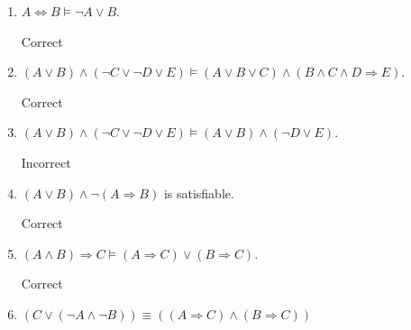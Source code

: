 \documentclass{article}
\begin{document}
\begin{enumerate}
\begin{enumerate}[label=($\alph*$)]
    \item $A \Leftrightarrow B \models \neg A \vee B$.

    \color{blue}
        Correct
    \color{black}



    \item $(A \vee B) \wedge (\neg C \vee \neg D \vee E) \models (A \vee B \vee C) \wedge (B \wedge C \wedge D \Rightarrow E)$.

    \color{blue}
        Correct
    \color{black}



    \item $(A \vee B) \wedge (\neg C \vee \neg D \vee E) \models (A \vee B) \wedge (\neg D \vee E)$.

    \color{blue}
        Incorrect
    \color{black}



    \item $(A \vee B) \wedge \neg (A \Rightarrow B)$ is satisfiable.

    \color{blue}
        Correct
    \color{black}



    \item $(A \wedge B) \Rightarrow C \models (A \Rightarrow C) \vee (B \Rightarrow C)$.

    \color{blue}
        Correct
    \color{black}



    \item $(C \vee (\neg A \wedge \neg B)) \equiv ((A \Rightarrow C) \wedge (B \Rightarrow C))$


\end{enumerate}
\end{enumerate}
\end{document}
